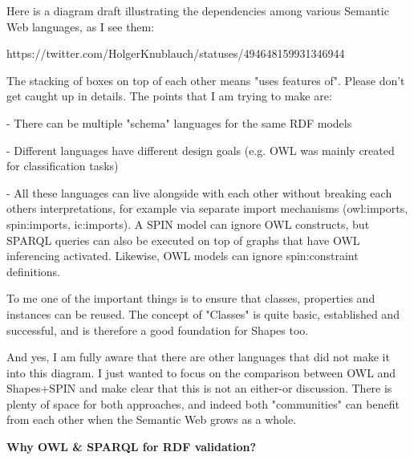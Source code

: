 \documentclass{llncs}
\begin{document}
Here is a diagram draft illustrating the dependencies among various 
Semantic Web languages, as I see them:

     https://twitter.com/HolgerKnublauch/statuses/494648159931346944

The stacking of boxes on top of each other means "uses features of". 
Please don't get caught up in details. The points that I am trying to 
make are:

- There can be multiple "schema" languages for the same RDF models

- Different languages have different design goals (e.g. OWL was mainly 
created for classification tasks)

- All these languages can live alongside with each other without 
breaking each others interpretations, for example via separate import 
mechanisms (owl:imports, spin:imports, ic:imports). A SPIN model can 
ignore OWL constructs, but SPARQL queries can also be executed on top of 
graphs that have OWL inferencing activated. Likewise, OWL models can 
ignore spin:constraint definitions.

To me one of the important things is to ensure that classes, properties 
and instances can be reused. The concept of "Classes" is quite basic, 
established and successful, and is therefore a good foundation for 
Shapes too.

And yes, I am fully aware that there are other languages that did not 
make it into this diagram. I just wanted to focus on the comparison 
between OWL and Shapes+SPIN and make clear that this is not an either-or 
discussion. There is plenty of space for both approaches, and indeed 
both "communities" can benefit from each other when the Semantic Web 
grows as a whole.

\textbf{Why OWL & SPARQL for RDF validation?}
\end{document}
